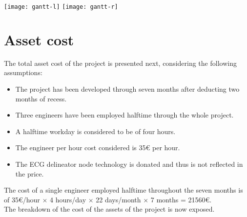 	\cleartoleftpage
	\label{sec:gantt}
	    	\texttt{[image: gantt-l]}
	    	\texttt{[image: gantt-r]}
\newpage
\section{Asset cost}
\label{sec:cost}
	The total asset cost of the project is presented next, considering the following assumptions:
	\begin{itemize}
		\item The project has been developed through seven months after deducting two months of recess.
		\item Three engineers have been employed halftime through the whole project.
		\item A halftime workday is considered to be of four hours.
		\item The engineer per hour cost considered is 35{\small \euro} per hour.
		\item The ECG delineator node technology is donated and thus is not reflected in the price.
	\end{itemize}

	The cost of a single engineer employed halftime throughout the seven months is of 35{\small \euro}/hour $\times$ 4 hours/day $\times$ 22 days/month $\times$ 7 months = 21560{\small \euro}.\\

	The breakdown of the cost of the assets of the project is now exposed.\\

